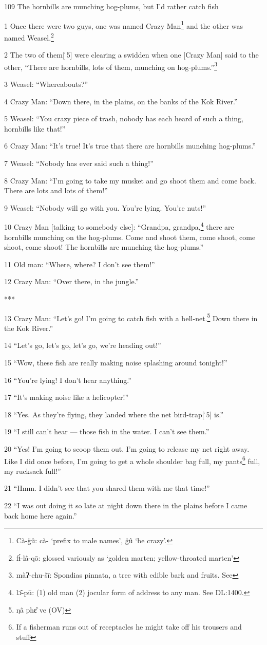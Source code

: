 
109 The hornbills are munching hog-plums, but I'd rather catch fish

1 Once there were two guys, one was named Crazy Man\footnote{Cà-g̈û: cà- `prefix to male names', g̈û `be crazy'.} and the other was named
Weasel.\footnote{fɨ́-lâ-qō: glossed variously as `golden marten; yellow-throated marten'}

2 The two of them[\.5] were clearing a swidden when one [Crazy Man] said to the
other, ``There are hornbills, lots of them, munching on hog-plums.''\footnote{màʔ-chu-šī: Spondias pinnata, a tree with edible bark and fruits. See}

3 Weasel: ``Whereabouts?''

4 Crazy Man: ``Down there, in the plains, on the banks of the Kok River.''

5 Weasel: ``You crazy piece of trash, nobody has each heard of such a thing, hornbills
like that!''

6 Crazy Man: ``It's true! It's true that there are hornbills munching hog-plums.''

7 Weasel: ``Nobody has ever said such a thing!''

8 Crazy Man: ``I'm going to take my musket and go shoot them and come back. There
are lots and lots of them!''

9 Weasel: ``Nobody will go with you. You're lying. You're nuts!''

10 Crazy Man [talking to somebody else]: ``Grandpa, grandpa,\footnote{lɔ̂-pū: (1) old man (2) jocular form of address to any man. See DL:1400.} there are hornbills
munching on the hog-plums. Come and shoot them, come shoot, come shoot, come shoot!
The hornbills are munching the hog-plums.''

11 Old man: ``Where, where? I don't see them!''

12 Crazy Man: ``Over there, in the jungle.''

***

13 Crazy Man: ``Let's go! I'm going to catch fish with a bell-net.\footnote{ŋâ phɛ̂ ve (OV)} Down there
in the Kok River.''

14 ``Let's go, let's go, let's go, we're heading out!''

15 ``Wow, these fish are really making noise splashing around tonight!''

16 ``You're lying! I don't hear anything.''

17 ``It's making noise like a helicopter!''

18 ``Yes. As they're flying, they landed where the net bird-trap[\.5] is.''

19 ``I still can't hear --- those fish in the water. I can't see them.''

20 ``Yes! I'm going to scoop them out. I'm going to release my net right away.
Like I did once before, I'm going to get a whole shoulder bag full, my pants\footnote{If a fisherman runs out of receptacles he might take off his trousers and stuff}
full, my rucksack full!''

21 ``Hmm. I didn't see that you shared them with me that time!''

22 ``I was out doing it so late at night down there in the plains before I came
back home here again.''

